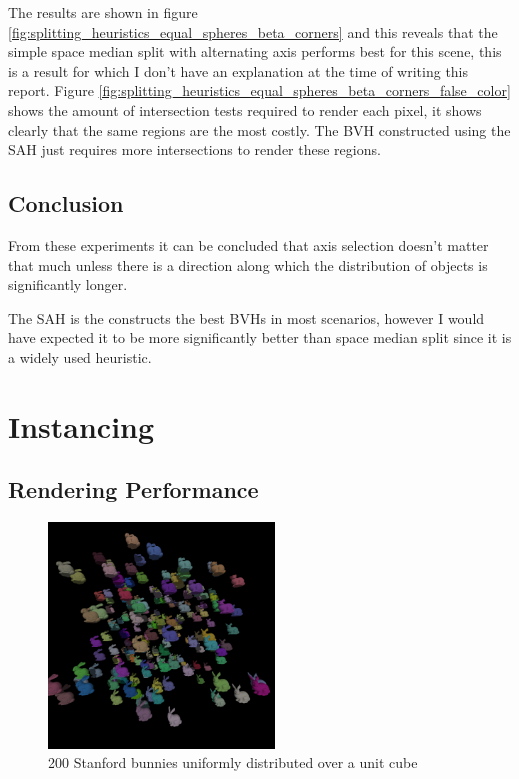 \documentclass{article}
\begin{document}
The results are shown in figure \ref{fig:splitting_heuristics_equal_spheres_beta_corners} and this reveals that the simple space median split with alternating axis performs best for this scene, this is a result for which I don't have an explanation at the time of writing this report. Figure \ref{fig:splitting_heuristics_equal_spheres_beta_corners_false_color} shows the amount of intersection tests required to render each pixel, it shows clearly that the same regions are the most costly. The BVH constructed using the SAH just requires more intersections to render these regions.

\subsection{Conclusion}

From these experiments it can be concluded that axis selection doesn't matter that much unless there is a direction along which the distribution of objects is significantly longer.

The SAH is the constructs the best BVHs in most scenarios, however I would have expected it to be more significantly better than space median split since it is a widely used heuristic.

\section{Instancing}

\subsection{Rendering Performance}

\begin{figure}[!htb]
    \centering
    \includegraphics[width=6cm]{renders/200_bunnies.png}
    \caption{200 Stanford bunnies uniformly distributed over a unit cube}
    \label{fig:200_bunnies}
\end{figure}
\end{document}
